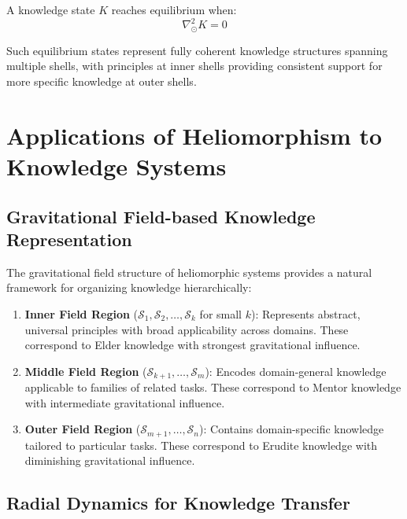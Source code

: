 \begin{theorem}
A knowledge state $K$ reaches equilibrium when:
\begin{equation}
\nabla_{\odot}^2 K = 0
\end{equation}
\end{theorem}

Such equilibrium states represent fully coherent knowledge structures spanning multiple shells, with principles at inner shells providing consistent support for more specific knowledge at outer shells.

\section{Applications of Heliomorphism to Knowledge Systems}

\subsection{Gravitational Field-based Knowledge Representation}

The gravitational field structure of heliomorphic systems provides a natural framework for organizing knowledge hierarchically:

\begin{enumerate}
    \item \textbf{Inner Field Region} ($\mathcal{S}_1, \mathcal{S}_2, \dots, \mathcal{S}_k$ for small $k$): Represents abstract, universal principles with broad applicability across domains. These correspond to Elder knowledge with strongest gravitational influence.
    
    \item \textbf{Middle Field Region} ($\mathcal{S}_{k+1}, \dots, \mathcal{S}_{m}$): Encodes domain-general knowledge applicable to families of related tasks. These correspond to Mentor knowledge with intermediate gravitational influence.
    
    \item \textbf{Outer Field Region} ($\mathcal{S}_{m+1}, \dots, \mathcal{S}_n$): Contains domain-specific knowledge tailored to particular tasks. These correspond to Erudite knowledge with diminishing gravitational influence.
\end{enumerate}

\subsection{Radial Dynamics for Knowledge Transfer}


